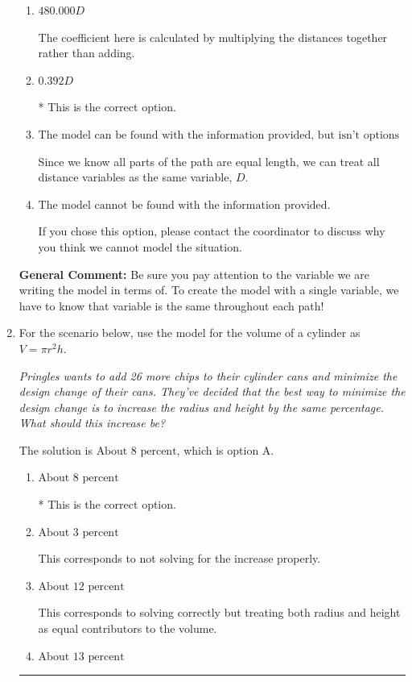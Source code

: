 \documentclass{extbook}[14pt]
\newcommand{\litem}[1]{\item #1

\rule{\textwidth}{0.4pt}}
\begin{document}
\begin{enumerate}
{\begin{enumerate}[label=\Alph*.]
The coefficient here is calculated as if you were trying to model the distance on the total path.
\item \( 480.000 D \)

The coefficient here is calculated by multiplying the distances together rather than adding.
\item \( 0.392 D \)

* This is the correct option.
\item \( \text{The model can be found with the information provided, but isn't options 1-3.} \)

Since we know all parts of the path are equal length, we can treat all distance variables as the same variable, $D$.
\item \( \text{The model cannot be found with the information provided.} \)

If you chose this option, please contact the coordinator to discuss why you think we cannot model the situation.
\end{enumerate}

\textbf{General Comment:} Be sure you pay attention to the variable we are writing the model in terms of. To create the model with a single variable, we have to know that variable is the same throughout each path!
}
\litem{
For the scenario below, use the model for the volume of a cylinder as $V = \pi r^2 h$.

\begin{center}
    \textit{ Pringles wants to add 26 \text{percent} more chips to their cylinder cans and minimize the design change of their cans. They've decided that the best way to minimize the design change is to increase the radius and height by the same percentage. What should this increase be? }
\end{center}
The solution is \( \text{About } 8 \text{ percent} \), which is option A.\begin{enumerate}[label=\Alph*.]
\item \( \text{About } 8 \text{ percent} \)

* This is the correct option.
\item \( \text{About } 3 \text{ percent} \)

This corresponds to not solving for the increase properly.
\item \( \text{About } 12 \text{ percent} \)

This corresponds to solving correctly but treating both radius and height as equal contributors to the volume.
\item \( \text{About } 13 \text{ percent} \)


\end{enumerate}}
\end{enumerate}
\end{document}
